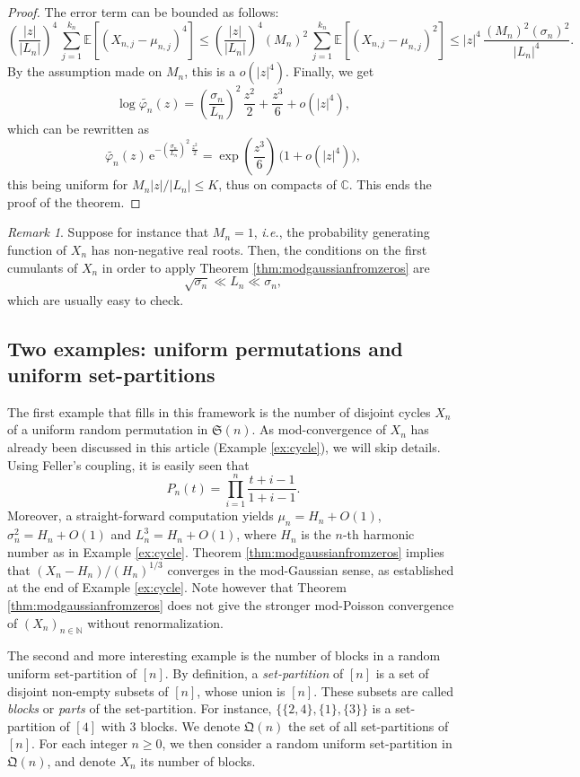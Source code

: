\documentclass[12pt,a4paper,reqno]{amsart}
\theoremstyle{remark}
\newtheorem{remark}[lemma]{Remark}
\newcommand{\N}{\mathbb{N}}
\newcommand{\C}{\mathbb{C}}
\newcommand{\E}{\mathrm{e}}
\newcommand{\esper}{\mathbb{E}}
\newcommand{\qym}{\mathfrak{Q}}
\begin{document}
\begin{proof}
The error term can be bounded as follows:
$$\left(\frac{|z|}{|L_n|}\right)^{\!4} \,\sum_{j=1}^{k_n}\esper[(X_{n,j}-\mu_{n,j})^4] \leq \left(\frac{|z|}{|L_n|}\right)^{\!4} (M_n)^2\,\sum_{j=1}^{k_n}\esper[(X_{n,j}-\mu_{n,j})^2] \leq |z|^4\,\frac{(M_n)^2(\sigma_n)^2}{|L_n|^4}.$$
By the assumption made on $M_n$, this is a $o(|z|^4)$. Finally, we get
\[\log \widetilde{\varphi_n}(z) = \left(\frac{\sigma_n}{L_n}\right)^2\,\frac{z^2}{2} + \frac{z^3}{6} + o(|z|^4),\]
which can be rewritten as
\[ \widetilde{\varphi_n}(z)\, \E^{-\left(\frac{\sigma_n}{L_n}\right)^2\,\frac{z^2}{2}} = \exp\left(\frac{z^3}{6}\right)\, \big(1+o(|z|^4)\big), \]
this being uniform for $M_n |z| /|L_n| \le K$, thus on compacts of $\C$. This ends the proof of the theorem.
\end{proof}

\begin{remark}
Suppose for instance that $M_n=1$, \emph{i.e.}, the probability generating function of $X_n$ has non-negative real roots. Then, the conditions on the first cumulants of $X_n$ in order to apply Theorem \ref{thm:modgaussianfromzeros} are
$$\sqrt{\sigma_n} \ll L_n \ll \sigma_n,$$
which are usually easy to check.
\end{remark}
\bigskip



\subsection{Two examples: uniform permutations and uniform set-partitions}\label{subsec:twoexamples}
The first example that fills in this framework is the number of disjoint cycles $X_n$ of a uniform random permutation in $\mathfrak{S}(n)$. As mod-convergence of $X_n$ has already been discussed in this article (Example \ref{ex:cycle}), we will skip details. Using Feller's coupling, it is easily seen that
\[P_n(t)= \prod_{i=1}^{n} \frac{t+i-1}{1+i-1}.\]
Moreover, a straight-forward computation yields $\mu_n=H_n+O(1)$, $\sigma^2_n=H_n+O(1)$ and $L^3_n=H_n+O(1)$, where $H_n$ is the $n$-th harmonic number as in Example \ref{ex:cycle}. Theorem \ref{thm:modgaussianfromzeros} implies that $(X_n-H_n)/(H_n)^{1/3}$ converges in the mod-Gaussian sense, as established at the end of Example \ref{ex:cycle}. Note however that Theorem \ref{thm:modgaussianfromzeros} does not give the stronger mod-Poisson convergence of $(X_n)_{n \in \N}$ without renormalization.
\bigskip

The second and more interesting example is the number of blocks in a random uniform set-partition of $[n]$.
By definition, a \emph{set-partition} of $[n]$ is a set of disjoint non-empty subsets of $[n]$, whose union is $[n]$.
These subsets are called \emph{blocks} or \emph{parts} of the set-partition. For instance, $\{\{2,4\},\{1\},\{3\}\}$ is a set-partition of $[4]$ with $3$ blocks. We denote $\qym(n)$ the set of all set-partitions of $[n]$. For each integer $n \ge 0$, we then consider a random uniform set-partition in $\qym(n)$, and denote $X_n$ its number of blocks.\bigskip
\end{document}
